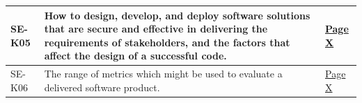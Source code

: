 \begin{longtable}{|p{2.5cm}|p{10cm}|p{1.5cm}|}
      SE-K05              & How to design, develop, and deploy software solutions that are secure
                            and effective in delivering the requirements of stakeholders, and
                            the factors that affect the design of a successful code. & \hyperref[sec:cicd]{Page X} \\ \hline

      SE-K06              & The range of metrics which might be used to evaluate a delivered
                            software product. & \hyperref[sec:cicd]{Page X} \\ \hline

      
    \end{longtable}